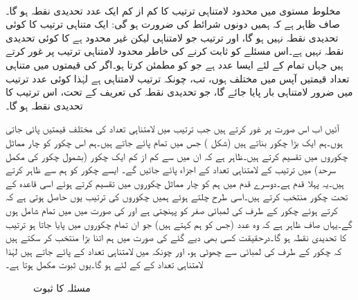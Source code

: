 \quad {}\\
مخلوط مستوی میں محدود لامتناہی ترتیب  کا کم از کم ایک عدد تحدیدی نقطہ ہو گا۔
\quad
صاف ظاہر ہے کہ ہمیں دونوں شرائط کی ضرورت ہو گی: ایک متناہی ترتیب کا کوئی تحدیدی نقطہ نہیں ہو گا، اور ترتیب  جو لامتناہی لیکن غیر محدود ہے کا کوئی تحدیدی نقطہ نہیں ہے۔اس مسئلے کو ثابت کرنے کی خاطر محدود لامتناہی ترتیب  پر غور کرتے ہیں جہاں تمام  کے لئے  ایسا عدد ہے جو  کو مطمئن کرتا ہو۔اگر  کی قیمتوں میں متناہی تعداد قیمتیں آپس میں مختلف ہوں، تب، چونکہ ترتیب لامتناہی ہے لہٰذا کوئی عدد  ترتیب میں ضرور لامتناہی بار پایا جائے گا، جو  تحدیدی نقطہ کی تعریف کے تحت، اس ترتیب کا تحدیدی نقطہ ہو گا۔

آئیں اب اس صورت پر غور کرتے ہیں جب ترتیب میں لامتناہی تعداد کی مختلف قیمتیں پائی جاتی ہوں۔ہم ایک بڑا چکور  بناتے ہیں  (شکل ) جس میں تمام  پائے جاتے ہیں۔ہم اس چکور کو چار مماثل  چکوروں میں تقسیم کرتے ہیں۔ظاہر ہے کہ ان میں سے کم از کم ایک چکور (بشمول چکور کی مکمل سرحد) میں ترتیب کے لامتناہی تعداد کے اجزاء پائے جائیں گے۔ ایسے چکور کو ہم  سے ظاہر کرتے ہیں۔یہ پہلا قدم ہے۔دوسرے قدم میں ہم  کو چار مماثل چکوروں میں تقسیم کرتے ہوئے اسی قاعدہ کے تحت چکور  منتخب کرتے ہیں۔اسی طرح چلتے ہوئے ہمیں چکوروں کی ترتیب 
 یوں حاصل ہوتی ہے کہ  کرتے ہوئے چکور  کے طرف کی لمبائی صفر کو پہنچتی ہے اور  کی صورت میں  میں تمام  شامل ہوں گے۔یہاں صاف ظاہر ہے کہ  وہ عدد (جس کو ہم  کہتے ہیں) جو ان تمام چکوروں میں پایا جاتا ہو ترتیب کا تحدیدی نقطہ ہو گا۔درحقیقت کسی بھی دیے گئے  کی صورت میں ہم  اتنا بڑا منتخب کر سکتے ہیں کہ  چکور  کے  طرف کی لمبائی  سے چھوٹی ہو، اور چونکہ  میں لامتناہی تعداد کے  پائے جاتے ہیں لہٰذا  لامتناہی تعداد کے  کے لئے  ہو گا۔یوں ثبوت مکمل ہوتا ہے۔
\begin{figure}
\centering
{}
\caption{مسئلہ  کا ثبوت}
\label{شکل_مسئلہ_ترتیب_بلزانو_وائشسٹراس}
\end{figure}

